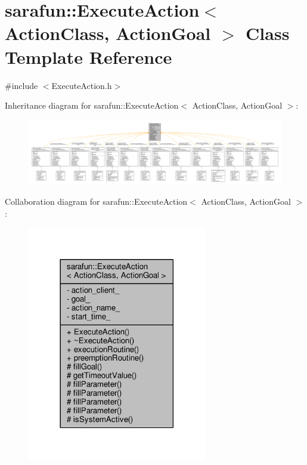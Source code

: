 \hypertarget{classsarafun_1_1ExecuteAction}{\section{sarafun\-:\-:Execute\-Action$<$ Action\-Class, Action\-Goal $>$ Class Template Reference}
\label{classsarafun_1_1ExecuteAction}
}


{\ttfamily \#include $<$Execute\-Action.\-h$>$}



Inheritance diagram for sarafun\-:\-:Execute\-Action$<$ Action\-Class, Action\-Goal $>$\-:
\nopagebreak
\begin{figure}[H]
\begin{center}
\leavevmode
\includegraphics[width=350pt]{db/d30/classsarafun_1_1ExecuteAction__inherit__graph}
\end{center}
\end{figure}


Collaboration diagram for sarafun\-:\-:Execute\-Action$<$ Action\-Class, Action\-Goal $>$\-:
\nopagebreak
\begin{figure}[H]
\begin{center}
\leavevmode
\includegraphics[width=222pt]{de/dc6/classsarafun_1_1ExecuteAction__coll__graph}
\end{center}
\end{figure}
